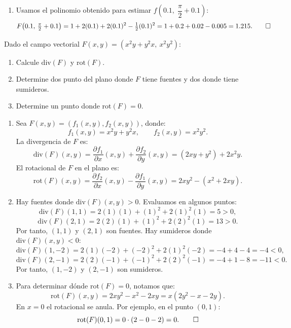 \documentclass[11pt,respuestas,a4]{aleph-examen}
\begin{document}
\begin{preguntas}
\begin{respuesta}
\begin{enumerate}
    \item Usamos el polinomio obtenido para estimar $f\!\left(0.1,\;\dfrac{\pi}{2}+0.1\right)$:
    \[
        F\!\left(0.1,\,\tfrac{\pi}{2}+0.1\right)
        =
        1+2(0.1)+2(0.1)^2-\tfrac{1}{2}(0.1)^2
        =
        1+0.2+0.02-0.005
        =
        1.215.\qedhere
    \]
\end{enumerate}
\end{respuesta}


\item
Dado el campo vectorial $F(x,y)=(x^2y+y^2x,\ x^2y^2)$:
\begin{enumerate}[leftmargin=*]
    \item Calcule $\mathrm{div}(F)$ y $\mathrm{rot}(F)$.
    \item Determine dos punto del plano donde $F$ tiene fuentes y dos donde tiene sumideros.
    \item Determine un punto donde $\mathrm{rot}(F)=0$.
\end{enumerate}


\begin{respuesta}
\begin{enumerate}
    \item Sea $F(x,y)=(f_1(x,y),f_2(x,y))$, donde:
    \[
        f_1(x,y)=x^2y+y^2x,
        \qquad
        f_2(x,y)=x^2y^2.
    \]
    La divergencia de $F$ es:
    \[
        \mathrm{div}(F)(x,y)
        =
        \frac{\partial f_1}{\partial x}(x,y)
        +
        \frac{\partial f_2}{\partial y}(x,y)
        =
        (2xy+y^2)+2x^2y.
    \]
    El rotacional de $F$ en el plano es:
    \[
        \mathrm{rot}(F)(x,y)
        =
        \frac{\partial f_2}{\partial x}(x,y)
        -
        \frac{\partial f_1}{\partial y}(x,y)
        =
        2xy^2-(x^2+2xy).
    \]

    \item Hay fuentes donde $\mathrm{div}(F)(x,y)>0$. Evaluamos en algunos puntos:
    \[
        \mathrm{div}(F)(1,1)=2(1)(1)+(1)^2+2(1)^2(1)=5>0,
    \]
    \[
        \mathrm{div}(F)(2,1)=2(2)(1)+(1)^2+2(2)^2(1)=13>0.
    \]
    Por tanto, $(1,1)$ y $(2,1)$ son fuentes. Hay sumideros donde $\mathrm{div}(F)(x,y)<0$:
    \[
        \mathrm{div}(F)(1,-2)=2(1)(-2)+(-2)^2+2(1)^2(-2)=-4+4-4=-4<0,
    \]
    \[
        \mathrm{div}(F)(2,-1)=2(2)(-1)+(-1)^2+2(2)^2(-1)=-4+1-8=-11<0.
    \]
    Por tanto, $(1,-2)$ y $(2,-1)$ son sumideros.

    \item Para determinar dónde $\mathrm{rot}(F)=0$, notamos que:
    \[
        \mathrm{rot}(F)(x,y)
        =
        2xy^2-x^2-2xy
        =
        x(2y^2-x-2y).
    \]
    En $x=0$ el rotacional se anula. Por ejemplo, en el punto $(0,1)$:
    \[
        \mathrm{rot}(F)(0,1)
        =
        0\cdot(2-0-2)
        =
        0.\qedhere
    \]
\end{enumerate}
\end{respuesta}


\end{preguntas}
\end{document}
